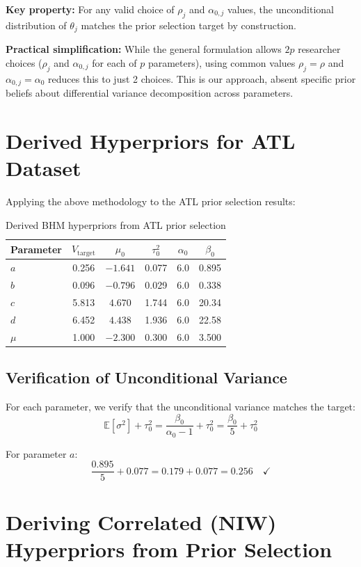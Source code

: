 \documentclass[11pt]{article}
\newcommand{\E}{\mathbb{E}}
\begin{document}
\textbf{Key property:} For any valid choice of $\rho_j$ and $\alpha_{0,j}$ values, the unconditional distribution of $\theta_j$ matches the prior selection target by construction.

\textbf{Practical simplification:} While the general formulation allows $2p$ researcher choices ($\rho_j$ and $\alpha_{0,j}$ for each of $p$ parameters), using common values $\rho_j = \rho$ and $\alpha_{0,j} = \alpha_0$ reduces this to just 2 choices. This is our approach, absent specific prior beliefs about differential variance decomposition across parameters.

\section{Derived Hyperpriors for ATL Dataset}

Applying the above methodology to the ATL prior selection results:

\begin{table}[h]
\centering
\begin{tabular}{lccccc}
\toprule
Parameter & $V_{\text{target}}$ & $\mu_0$ & $\tau_0^2$ & $\alpha_0$ & $\beta_0$ \\
\midrule
$a$ & 0.256 & $-1.641$ & 0.077 & 6.0 & 0.895 \\
$b$ & 0.096 & $-0.796$ & 0.029 & 6.0 & 0.338 \\
$c$ & 5.813 & $4.670$ & 1.744 & 6.0 & 20.34 \\
$d$ & 6.452 & $4.438$ & 1.936 & 6.0 & 22.58 \\
$\mu$ & 1.000 & $-2.300$ & 0.300 & 6.0 & 3.500 \\
\bottomrule
\end{tabular}
\caption{Derived BHM hyperpriors from ATL prior selection}
\end{table}

\subsection{Verification of Unconditional Variance}

For each parameter, we verify that the unconditional variance matches the target:
\[
  \E[\sigma^2] + \tau_0^2 = \frac{\beta_0}{\alpha_0 - 1} + \tau_0^2 = \frac{\beta_0}{5} + \tau_0^2
\]

For parameter $a$:
\[
  \frac{0.895}{5} + 0.077 = 0.179 + 0.077 = 0.256 \quad \checkmark
\]

\section{Deriving Correlated (NIW) Hyperpriors from Prior Selection}
\end{document}

